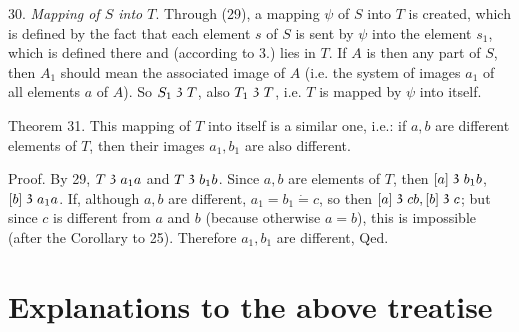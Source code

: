 \documentclass[leqno]{article}
\newcommand\partof{\mathrel{\raisebox{0.45ex}{$\mathfrak{3}$}}}
\begin{document}
30. \emph{Mapping of $S$ into $T$}. Through (29), a mapping $\psi$ of $S$ into $T$ is created, which is defined by the fact that each element $s$ of $S$ is sent by $\psi$ into the element $s_1$, which is defined there and (according to 3.) lies in $T$. 
If $A$ is then any part of $S$, then $A_1$ should mean the associated image of $A$ (i.e. the system of images $a_1$ of all elements $a$ of $A$). So $S_1 \partof T$, also $T_1 \partof T$, i.e. $T$ is mapped by $\psi$ into itself.

Theorem 31. This mapping of $T$ into itself is a similar one, i.e.: if $a, b$ are different elements of $T$, then their images $a_1, b_1$ are also different.

Proof. By 29, $T \partof a_1a$ and $T \partof b_1b$. Since $a, b$ are elements of $T$, then $[a] \partof b_1b$, $[b] \partof a_1a$. If, although $a, b$ are different, $a_1 = b_1  \dot{=} 
c$, so then $[a] \partof cb, [b] \partof c$; but since $c$ is different from $a$ and $b$ (because otherwise $a=b$), this is impossible (after the Corollary to 25). Therefore $a_1, b_1$ are different, Qed.


\section*{Explanations to the above treatise}
\end{document}
